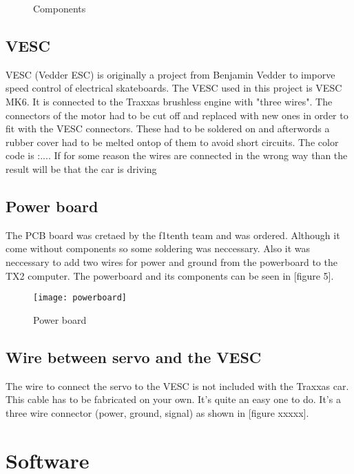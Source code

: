 \documentclass{article}
\begin{document}
\begin{figure}[h]
\centering
{}
\caption{Components}
\label{fig:Components}
\end{figure}
	\subsection{VESC}
		VESC (Vedder ESC) is originally a project from Benjamin Vedder to imporve speed control of electrical skateboards. The VESC used in this project is VESC MK6. It is connected to the Traxxas brushless engine with "three wires". The connectors of the motor had to be cut off and replaced with new ones in order to fit with the VESC connectors. These had to be soldered on and afterwords a rubber cover had to be melted ontop of them to avoid short circuits. The color code is :.... If for some reason the wires are connected in the wrong way than the result will be that the car is driving
	\subsection{Power board}
		The PCB board was cretaed by the f1tenth team and was ordered. Although it come without components so some soldering was neccessary.
		Also it was neccessary to add two wires for power and ground from the powerboard to the TX2 computer.
		The powerboard and its components can be seen in [figure 5].

		\begin{figure}[h]
		\centering
		\texttt{[image: powerboard]}
		\caption{Power board}
		\end{figure}
	\subsection{Wire between servo and the VESC}
		The wire to connect the servo to the VESC is not included with the Traxxas car. This cable has to be fabricated on your own. It's quite an easy one to do. It's a three wire connector (power, ground, signal) as shown in [figure xxxxx].


\newpage

\section{Software}
\end{document}
